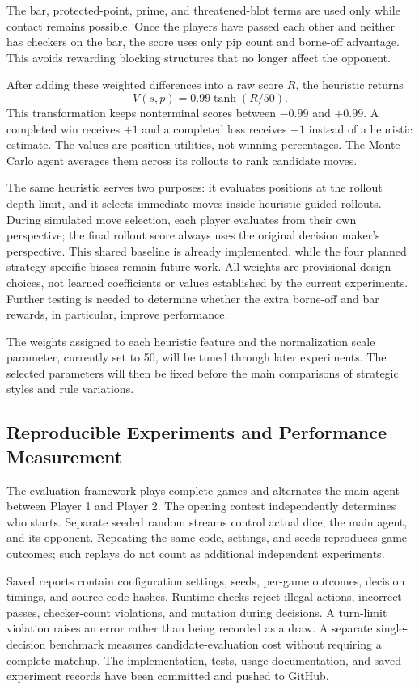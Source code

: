 \documentclass[12pt,twoside]{article}
\begin{document}
The bar, protected-point, prime, and threatened-blot terms are used only while
contact remains possible. Once the players have passed each other and neither
has checkers on the bar, the score uses only pip count and borne-off advantage.
This avoids rewarding blocking structures that no longer affect the opponent.

After adding these weighted differences into a raw score $R$, the heuristic
returns
\[
    V(s,p)=0.99\tanh(R/50).
\]
This transformation keeps nonterminal scores between $-0.99$ and $+0.99$.
A completed win receives $+1$ and a completed loss receives $-1$ instead of a
heuristic estimate. The values are position utilities, not winning percentages.
The Monte Carlo agent averages them across its rollouts to rank candidate moves.

The same heuristic serves two purposes: it evaluates positions at the rollout
depth limit, and it selects immediate moves inside heuristic-guided rollouts.
During simulated move selection, each player evaluates from their own perspective;
the final rollout score always uses the original decision maker's perspective.
This shared baseline is already implemented, while the four planned
strategy-specific biases remain future work. All weights are provisional
design choices, not learned coefficients or values established by the current
experiments. Further testing is needed to determine whether the extra borne-off
and bar rewards, in particular, improve performance.

The weights assigned to each heuristic feature and the normalization scale
parameter, currently set to 50, will be tuned through later experiments.
The selected parameters will then be fixed before the main comparisons of
strategic styles and rule variations.


\subsection{Reproducible Experiments and Performance Measurement}

The evaluation framework plays complete games and alternates the main agent
between Player 1 and Player 2. The opening contest independently determines who
starts. Separate seeded random streams control actual dice, the main agent,
and its opponent. Repeating the same code, settings, and seeds reproduces game
outcomes; such replays do not count as additional independent experiments.

Saved reports contain configuration settings, seeds, per-game outcomes,
decision timings, and source-code hashes. Runtime checks reject illegal actions,
incorrect passes, checker-count violations, and mutation during decisions.
A turn-limit violation raises an error rather than being recorded as a draw.
A separate single-decision benchmark measures candidate-evaluation cost without
requiring a complete matchup. The implementation, tests, usage documentation,
and saved experiment records have been committed and pushed to GitHub.
\end{document}
